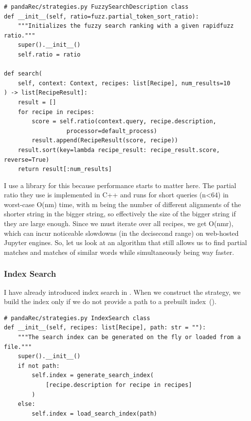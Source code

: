 \documentclass[
     12pt,                    %
     a4paper,             %
     BCOR=10mm,     %
     DIV=14,                 %
     listof=totoc,                    %
     bibliography=totoc,       %
     index=totoc,              %
     twoside,
     headsepline
     ]{scrreprt}
\begin{document}
\begin{listing}[htb]
	\begin{verbatim}
# pandaRec/strategies.py FuzzySearchDescription class
def __init__(self, ratio=fuzz.partial_token_sort_ratio):
	"""Initializes the fuzzy search ranking with a given rapidfuzz ratio."""
	super().__init__()
	self.ratio = ratio 

def search(
	self, context: Context, recipes: list[Recipe], num_results=10
) -> list[RecipeResult]:
	result = []
	for recipe in recipes:
		score = self.ratio(context.query, recipe.description,
                  processor=default_process)
		result.append(RecipeResult(score, recipe))
	result.sort(key=lambda recipe_result: recipe_result.score, reverse=True)
	return result[:num_results]
		\end{verbatim}
	\caption[Fuzzy Search]{Fuzzy Search.\label{list:fuzzy}}
\end{listing}

I use a library for this because performance starts to matter here. The partial ratio they use is implemented in C++ and runs for short queries (n<64) in worst-case O(nm) time, with m being the number of different alignments of the shorter string in the bigger string, so effectively the size of the bigger string if they are large enough. Since we must iterate over all recipes, we get O(nmr), which can incur noticeable slowdowns (in the decisecond range) on web-hosted Jupyter engines. So, let us look at an algorithm that still allows us to find partial matches and matches of similar words while simultaneously being way faster.


\subsubsection{Index Search}

I have already introduced index search in . When we construct the strategy, we build the index only if we do not provide a path to a prebuilt index~().

\begin{listing}[htb]
	\begin{verbatim}
# pandaRec/strategies.py IndexSearch class
def __init__(self, recipes: list[Recipe], path: str = ""):
	"""The search index can be generated on the fly or loaded from a file."""
	super().__init__()
	if not path:
		self.index = generate_search_index(
			[recipe.description for recipe in recipes]
		)
	else:
		self.index = load_search_index(path)
	\end{verbatim}
	\caption[Index Search Constructor]{Index Search Constructor.\label{list:index}}
\end{listing}
\end{document}
